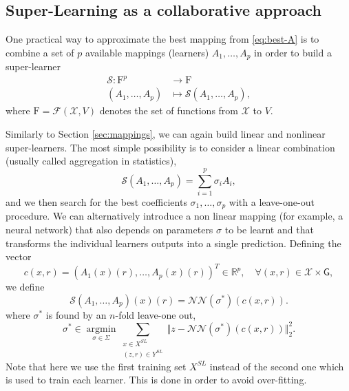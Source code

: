 \documentclass[11pt,a4paper,twoside]{article}
\newcommand{\asmodif}[2]{{\color{teal} #1} {\sout{#2}}}
\theoremstyle{definition}
\numberwithin{equation}{section}
\newcommand{\cF}{\ensuremath{\mathcal{F}}}
\newcommand{\cS}{\ensuremath{\mathcal{S}}}
\newcommand{\cX}{\ensuremath{\mathcal{X}}}
\newcommand{\bR}{\ensuremath{\mathbb{R}}}
\newcommand{\rF}{\ensuremath{\mathrm{F}}}
\newcommand{\G}{\ensuremath{\textsf{G}}} %
\newcommand{\<}{\langle}
\renewcommand{\>}{\rangle}
\newcommand{\argmin}{\operatorname{argmin}}
\begin{document}
\subsection{Super-Learning as a collaborative approach}
\label{sec:super-learning}

One practical way to approximate the best mapping from \eqref{eq:best-A} is to combine a set of $p$ available mappings (learners) $A_1, \dots, A_p$ in order to build a super-learner
\begin{align}
\cS: \rF^p &\to \rF \\
( A_1, \dots, A_p) &\mapsto \cS(A_1, \dots, A_p),
\end{align}
where $\rF = \cF(\cX, V)$ denotes the set of functions from $\cX$ to $V$.

Similarly to Section \ref{sec:mappings}, we can again build linear and nonlinear super-learners. The most simple possibility is to consider a linear combination (usually called aggregation in statistics),
$$
\cS(A_1, \dots, A_p) = \sum_{i=1}^p \sigma_i A_i,
$$
and we then search for the best coefficients $\sigma_1, \dots, \sigma_p$ with a leave-one-out procedure. We can alternatively introduce a non linear mapping (for example, a neural network) that also depends on parameters $\sigma$ to be learnt and that transforms the individual learners outputs into a single prediction. Defining the vector
$$
c(x, r) = ( A_1(x)(r), \dots, A_p(x)(r) )^T \in \bR^p, \quad \forall (x,r)\in \cX\times \G,
$$
we define
$$
\cS(A_1, \dots, A_p)(x)(r) =  \mathcal{NN} (\sigma^*)( c(x,r) ). 
$$
where $\sigma^*$ is found by an $n$-fold leave-one out,
\asmodif{
$$
\sigma^* \in \underset{\sigma \in \Sigma}{\argmin}
\sum_{\substack{x\in X^{SL} \\ (z, r)\in Y^{SL}}}
\Vert z -  \mathcal{NN} (\sigma^*)( c(x,r) ) \Vert^2_2.
$$
Note that here we use the first training set $X^{SL}$ instead of the second one which is used to train each learner.}{} This is done in order to avoid over-fitting.

\end{document}
